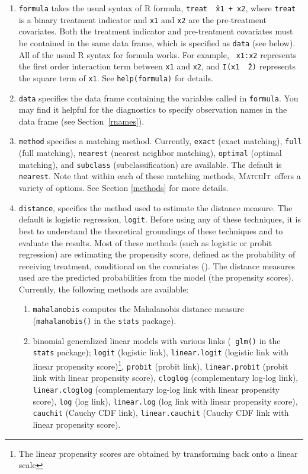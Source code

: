 \documentclass[oneside,letterpaper,titlepage]{article}
\newcommand{\MatchIt}{\textsc{MatchIt}}
\begin{document}
\begin{enumerate}
  
\item \texttt{formula} takes the usual syntax of R formula, {\tt treat
    \~\ x1 + x2}, where {\tt treat} is a binary treatment indicator
  and {\tt x1} and {\tt x2} are the pre-treatment covariates. Both the
  treatment indicator and pre-treatment covariates must be contained
  in the same data frame, which is specified as {\tt data} (see
  below).  All of the usual R syntax for formula works. For example, {\tt
    x1:x2} represents the first order interaction term between {\tt x1}
  and {\tt x2}, and {\tt I(x1 \^\ 2)} represents the square term of
  {\tt x1}. See {\tt help(formula)} for details.
  
\item \texttt{data} specifies the data frame containing the variables
  called in {\tt formula}.  You may find it helpful for the
  diagnostics to specify observation names in the data frame (see
  Section~\ref{rnames}).
  
\item \texttt{method} specifies a matching method. Currently,
  \texttt{exact} (exact matching), \texttt{full} (full matching),
  \texttt{nearest} (nearest neighbor matching), \texttt{optimal}
  (optimal matching), and \texttt{subclass} (subclassification) are
  available. The default is \texttt{nearest}. Note that within each of
  these matching methods, \MatchIt\ offers a variety of options.  See
  Section \ref{methods} for more details.
  
\item \texttt{distance}, specifies the method used to estimate the
  distance measure. The default is logistic regression, {\tt logit}.
  Before using any of these techniques, it is best to understand the
  theoretical groundings of these techniques and to evaluate the
  results.  Most of these methods (such as logistic or probit
  regression) are estimating the propensity score, defined as the
  probability of receiving treatment, conditional on the covariates
  (\cite{RosRub83}).  The distance measures used are the predicted
  probabilities from the model (the propensity scores).  Currently,
  the following methods are available:
  \begin{enumerate}
  \item {\tt mahalanobis} computes the Mahalanobis distance measure
    ({\tt mahalanobis()} in the {\tt stats} package).
  \item binomial generalized linear models with various links ({\tt
      glm()} in the {\tt stats} package); \texttt{logit} (logistic
    link), {\tt linear.logit} (logistic link with linear propensity
    score)\footnote{The linear propensity scores are obtained by
      transforming back onto a linear scale}, \texttt{probit} (probit
    link), {\tt linear.probit} (probit link with linear propensity
    score), {\tt cloglog} (complementary log-log link), {\tt
      linear.cloglog} (complementary log-log link with linear
    propensity score), {\tt log} (log link), {\tt linear.log} (log
    link with linear propensity score), {\tt cauchit} (Cauchy CDF
    link), {\tt linear.cauchit} (Cauchy CDF link with linear
    propensity score).


\end{enumerate}
\end{enumerate}
\end{document}
